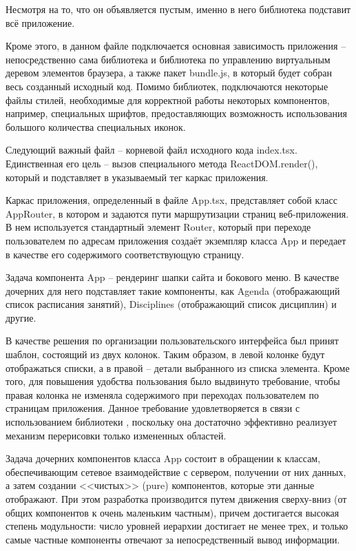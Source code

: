 Несмотря на то, что он объявляется пустым, именно в него библиотека \react подставит всё приложение.

Кроме этого, в данном файле подключается основная зависимость приложения -- непосредственно сама библиотека \react и библиотека по управлению виртуальным деревом элементов браузера, а также пакет bun\-dle.js, в который будет собран весь созданный исходный код. Помимо библиотек, подключаются некоторые файлы стилей, необходимые для корректной работы некоторых компонентов, например, специальных шрифтов, предоставляющих возможность использования большого количества специальных иконок.

Следующий важный файл -- корневой файл исходного \typescript кода index.tsx. Единственная его цель -- вызов специального метода React\-DOM.ren\-der(), который и подставляет в указываемый тег каркас приложения.

Каркас приложения, определенный в файле App.tsx, представляет собой класс AppRouter, в котором и задаются пути маршрутизации страниц веб-приложения. В нем используется стандартный элемент Router, который при переходе пользователем по адресам приложения создаёт экземпляр класса App и передает в качестве его содержимого соответствующую страницу.

Задача компонента App -- рендеринг шапки сайта и бокового меню. В качестве дочерних для него \react подставляет такие компоненты, как Agenda (отображающий список расписания занятий), Disciplines (отображающий список дисциплин) и другие.

В качестве решения по организации пользовательского интерфейса был принят шаблон, состоящий из двух колонок. Таким образом, в левой колонке будут отображаться списки, а в правой -- детали выбранного из списка элемента. Кроме того, для повышения удобства пользования было выдвинуто требование, чтобы правая колонка не изменяла содержимого при переходах пользователем по страницам приложения. Данное требование удовлетворяется в связи с использованием библиотеки \react, поскольку она достаточно эффективно реализует механизм перерисовки только измененных областей. 

Задача дочерних компонентов класса App состоит в обращении к классам, обеспечивающим сетевое взаимодействие с сервером, получении от них данных, а затем создании <<чистых>> (pure) компонентов, которые эти данные отображают. При этом разработка производится путем движения сверху-вниз (от общих компонентов к очень маленьким частным), причем достигается высокая степень модульности: число уровней иерархии достигает не менее трех, и только самые частные компоненты отвечают за непосредственный вывод информации.

